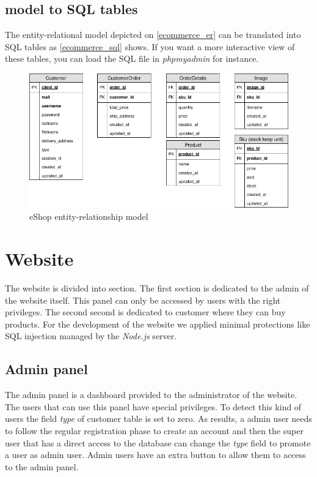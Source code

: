 \documentclass{article}
\begin{document}
\subsection{model to SQL tables}
The entity-relational model depicted on \autoref{ecommerce_er} can be translated into SQL tables as \autoref{ecommerce_sql} shows. If you want a more interactive view of these tables, you can load the SQL file in \textit{phpmyadmin} for instance.

\begin{figure}[h!]
    \centering
    \includegraphics[scale=0.4]{./images/ecommercev2_sql.png}
    \caption{eShop entity-relationship model}
    \label{ecommerce_sql}
\end{figure}

\section{Website}
The website is divided into section. The first section is dedicated to the admin of the website itself. This panel can only be accessed by users with the right privileges. The second second is dedicated to customer where they can buy products. For the development of the website we applied minimal protections like SQL injection managed by the \textit{Node.js} server.

\subsection{Admin panel}
The admin panel is a dashboard provided to the administrator of the website. The users that can use this panel have special privileges. To detect this kind of users the field \textit{type} of customer table is set to zero. As results, a admin user needs to follow the regular registration phase to create an account and then the super user that has a direct access to the database can change the \textit{type} field to promote a user as admin user. Admin users have an extra button to allow them to access to the admin panel.\\
\end{document}

